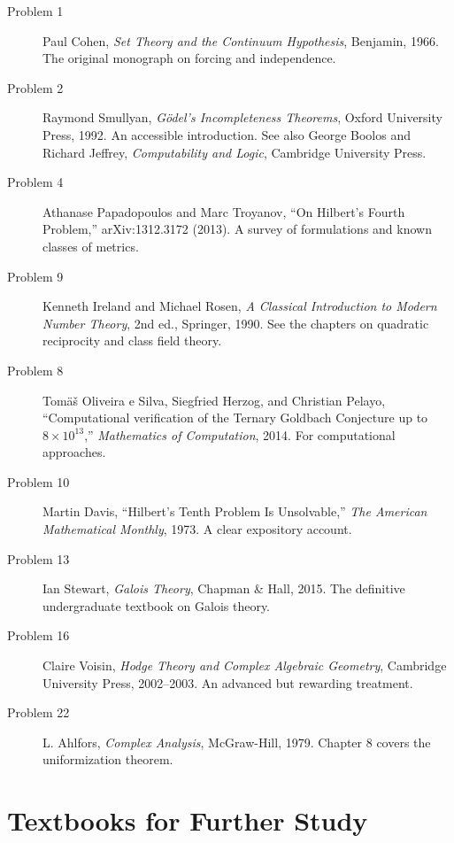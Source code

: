 \begin{description}
    \item[Problem 1] Paul Cohen, \textit{Set Theory and the Continuum Hypothesis}, Benjamin, 1966. The original monograph on forcing and independence.

    \item[Problem 2] Raymond Smullyan, \textit{G\"odel's Incompleteness Theorems}, Oxford University Press, 1992. An accessible introduction. See also George Boolos and Richard Jeffrey, \textit{Computability and Logic}, Cambridge University Press.

    \item[Problem 4] Athanase Papadopoulos and Marc Troyanov, ``On Hilbert's Fourth Problem,'' arXiv:1312.3172 (2013). A survey of formulations and known classes of metrics.

    \item[Problem 9] Kenneth Ireland and Michael Rosen, \textit{A Classical Introduction to Modern Number Theory}, 2nd ed., Springer, 1990. See the chapters on quadratic reciprocity and class field theory.

    \item[Problem 8] Tom\"a\v{s} Oliveira e Silva, Siegfried Herzog, and Christian Pelayo, ``Computational verification of the Ternary Goldbach Conjecture up to $8 \times 10^{13}$,'' \textit{Mathematics of Computation}, 2014. For computational approaches.

    \item[Problem 10] Martin Davis, ``Hilbert's Tenth Problem Is Unsolvable,'' \textit{The American Mathematical Monthly}, 1973. A clear expository account.

    \item[Problem 13] Ian Stewart, \textit{Galois Theory}, Chapman \& Hall, 2015. The definitive undergraduate textbook on Galois theory.

    \item[Problem 16] Claire Voisin, \textit{Hodge Theory and Complex Algebraic Geometry}, Cambridge University Press, 2002--2003. An advanced but rewarding treatment.

    \item[Problem 22] L. Ahlfors, \textit{Complex Analysis}, McGraw-Hill, 1979. Chapter 8 covers the uniformization theorem.
\end{description}

\section*{Textbooks for Further Study}

